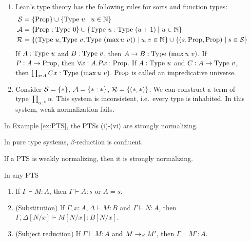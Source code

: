 \begin{example}
\begin{enumerate}
{        }
        \item{
            Lean's type theory has the following rules for sorts and function types: 
            \begin{align*}
                \fS &= \{\proptype\} \cup \{ \typeu{u} \mid u \in \bN\} \\
                \fA &= \{\proptype : \typeu{0}\} \cup \{\typeu{u} : \typeu{(u + 1)} \mid u \in \bN\} \\
                \fR &= \{ (\typeu{u}, \typeu{v}, \typeu{(\max u\ v)}) \mid u,v \in \bN\} \cup \{(s, \proptype, \proptype) \mid s \in \fS\}
            \end{align*}
            If $A : \mathrm{Type}\ u$ and $B : \mathrm{Type}\ v$, then $A \to B : \mathrm{Type}\ (\max u\ v)$.
            If $P : A \to \mathrm{Prop}$, then $\forall x : A. Px : \mathrm{Prop}$. 
            If $A : \mathrm{Type}\ u$ and $C : A \to \mathrm{Type}\ v$, then $\prod_{x : A} Cx : \mathrm{Type}\ (\max u \ v)$.
            $\mathrm{Prop}$ is called an \alert{impredicative universe}.
        }
        \item {
            Consider $\mathcal{S} = \{*\}$, $\mathcal{A} = \{* :*\}$, $\mathcal{R} = \{(*, *)\}$. 
            We can construct a term of type $\prod_{\alpha : *} \alpha$. 
            This system is \alert{inconsistent}, i.e.\ every type is inhabited. 
            In this system, weak normalization fails. 
        }
    \end{enumerate}
\end{example}

\begin{boxlem}
    In Example \ref{ex:PTS}, the PTSs (i)-(vi) are strongly normalizing.
\end{boxlem}

\begin{boxprop}[Confluence]
    In pure type systems, $\beta$-reduction is confluent.
\end{boxprop}

\begin{conj}
    If a PTS is weakly normalizing, then it is strongly normalizing. 
\end{conj}

\begin{boxprop}\label{prop:PTS}
    In any PTS 
    \begin{enumerate}
        \item If $\Gamma \vdash M : A$, then $\Gamma \vdash A : s$ or $A = s$.
        \item (Substitution) If $\Gamma, x : A, \Delta \vdash M : B$ and $\Gamma \vdash N : A$, then $\Gamma, \Delta[N/x] \vdash M[N/x] : B[N/x]$.
        \item (Subject reduction) If $\Gamma \vdash M : A$ and $M \to_{\beta} M'$, then $\Gamma \vdash M' : A$.
    \end{enumerate}
\end{boxprop}

